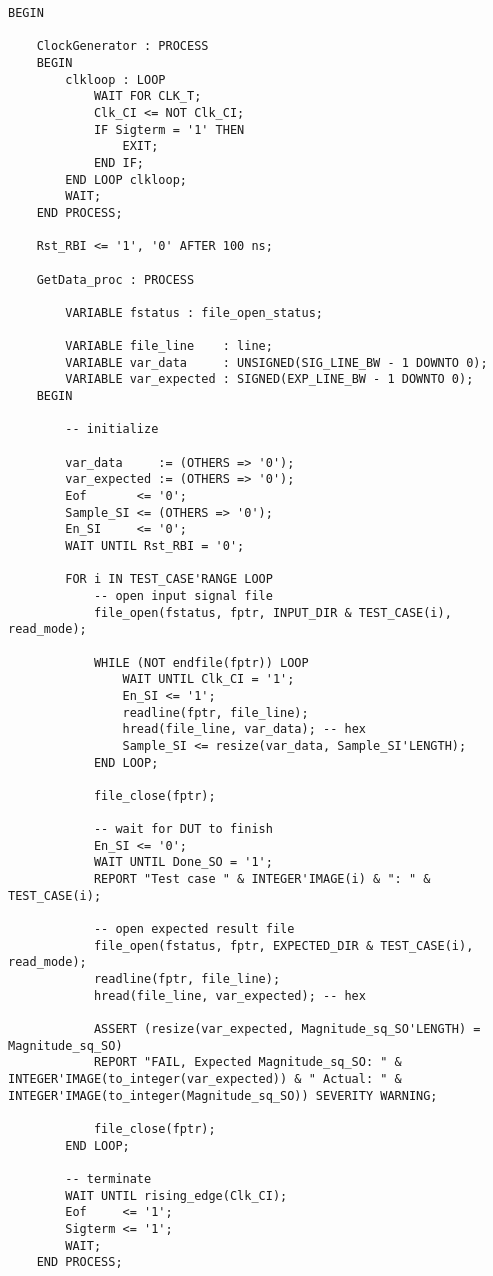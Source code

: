 \begin{lstlisting}
BEGIN

    ClockGenerator : PROCESS
    BEGIN
        clkloop : LOOP
            WAIT FOR CLK_T;
            Clk_CI <= NOT Clk_CI;
            IF Sigterm = '1' THEN
                EXIT;
            END IF;
        END LOOP clkloop;
        WAIT;
    END PROCESS;

    Rst_RBI <= '1', '0' AFTER 100 ns;

    GetData_proc : PROCESS

        VARIABLE fstatus : file_open_status;

        VARIABLE file_line    : line;
        VARIABLE var_data     : UNSIGNED(SIG_LINE_BW - 1 DOWNTO 0);
        VARIABLE var_expected : SIGNED(EXP_LINE_BW - 1 DOWNTO 0);
    BEGIN

        -- initialize

        var_data     := (OTHERS => '0');
        var_expected := (OTHERS => '0');
        Eof       <= '0';
        Sample_SI <= (OTHERS => '0');
        En_SI     <= '0';
        WAIT UNTIL Rst_RBI = '0';

        FOR i IN TEST_CASE'RANGE LOOP
            -- open input signal file
            file_open(fstatus, fptr, INPUT_DIR & TEST_CASE(i), read_mode);

            WHILE (NOT endfile(fptr)) LOOP
                WAIT UNTIL Clk_CI = '1';
                En_SI <= '1';
                readline(fptr, file_line);
                hread(file_line, var_data); -- hex
                Sample_SI <= resize(var_data, Sample_SI'LENGTH);
            END LOOP;

            file_close(fptr);

            -- wait for DUT to finish
            En_SI <= '0';
            WAIT UNTIL Done_SO = '1';
            REPORT "Test case " & INTEGER'IMAGE(i) & ": " & TEST_CASE(i);

            -- open expected result file
            file_open(fstatus, fptr, EXPECTED_DIR & TEST_CASE(i), read_mode);
            readline(fptr, file_line);
            hread(file_line, var_expected); -- hex

            ASSERT (resize(var_expected, Magnitude_sq_SO'LENGTH) = Magnitude_sq_SO)
            REPORT "FAIL, Expected Magnitude_sq_SO: " & INTEGER'IMAGE(to_integer(var_expected)) & " Actual: " & INTEGER'IMAGE(to_integer(Magnitude_sq_SO)) SEVERITY WARNING;

            file_close(fptr);
        END LOOP;

        -- terminate
        WAIT UNTIL rising_edge(Clk_CI);
        Eof     <= '1';
        Sigterm <= '1';
        WAIT;
    END PROCESS;


\end{lstlisting}
